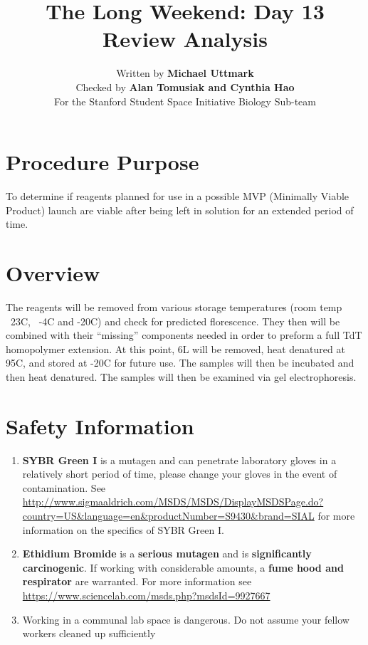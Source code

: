 \documentclass[a4paper]{article}
\title{The Long Weekend: Day 13 Review Analysis}
\author{Written by \textbf{Michael Uttmark}\\
		Checked by \textbf{Alan Tomusiak and Cynthia Hao}\\
        For the Stanford Student Space Initiative Biology Sub-team}
\newenvironment{safety}{%
\begin{tcolorbox}[width=\textwidth, colframe=safetyFrame, arc=1.5mm]
}%
{\end{tcolorbox}}
\newcommand{\C}{\degree C}
\newcommand{\B}[1]{\textbf{#1}}
\newcommand{\uL}{\micro{}L}
\begin{document}
\maketitle

\section{Procedure Purpose}
To determine if reagents planned for use in a possible MVP (Minimally Viable Product) launch are viable after being left in solution for an extended period of time. 

\section{Overview}
The reagents will be removed from various storage temperatures (room temp ~23\C, ~-4\C\: and -20\C) and check for predicted florescence. They then will be combined with their “missing” components needed in order to preform a full TdT homopolymer extension. At this point, 6\uL{} will be removed, heat denatured at 95\C, and stored at -20\C\: for future use. The samples will then be incubated and then heat denatured. The samples will then be examined via gel electrophoresis.\\

\section{Safety Information}
\begin{safety}
\begin{enumerate}
\item{\B{SYBR Green I} is a mutagen and can penetrate laboratory gloves in a relatively short period of time, please change your gloves in the event of contamination. See \url{http://www.sigmaaldrich.com/MSDS/MSDS/DisplayMSDSPage.do?country=US&language=en&productNumber=S9430&brand=SIAL} for more information on the specifics of SYBR Green I. 
}
\item{\B{Ethidium Bromide} is a \B{serious mutagen} and is \B{significantly carcinogenic}. If working with considerable amounts, a \B{fume hood and respirator} are warranted. For more information see \url{https://www.sciencelab.com/msds.php?msdsId=9927667}
}
\item{Working in a communal lab space is dangerous. Do not assume your fellow workers cleaned up sufficiently}
\end{enumerate}
\end{safety}
\end{document}
